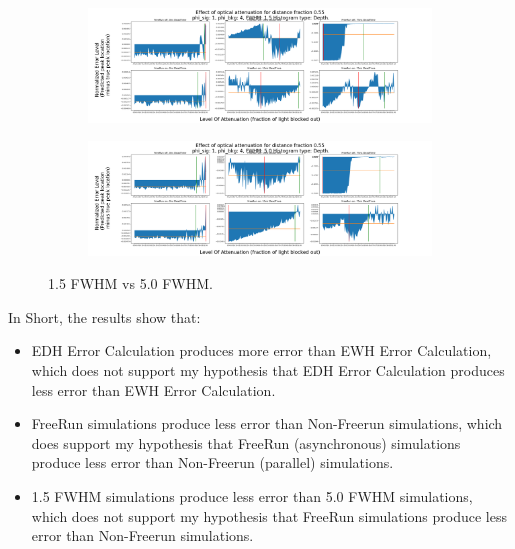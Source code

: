 \documentclass{beamer}
\begin{document}
\begin{frame}
  \begin{figure}[H]
    \centering
    \begin{subfigure}[b]{1\textwidth}
      \includegraphics[width=1\linewidth]{1.5Example.png}
      \label{fig:1.5Example}
    \end{subfigure}
    \begin{subfigure}[b]{1\textwidth}
      \includegraphics[width=1\linewidth]{5.0Example.png}
      \label{fig:5.0Example}
    \end{subfigure}
    \caption{\label{fig:pulseComparison}1.5 FWHM vs 5.0 FWHM.}
  \end{figure}
\end{frame}

\begin{frame}
\end{frame}

\begin{frame}
  In Short, the results show that:
  \begin{itemize}
  \item EDH Error Calculation produces more error than EWH Error Calculation, which does not support my hypothesis that EDH Error Calculation produces less error than EWH Error Calculation.
  \item FreeRun simulations produce less error than Non-Freerun simulations, which does support my hypothesis that FreeRun (asynchronous) simulations produce less error than Non-Freerun (parallel) simulations.
  \item 1.5 FWHM simulations produce less error than 5.0 FWHM simulations, which does not support my hypothesis that FreeRun simulations produce less error than Non-Freerun simulations.
  \end{itemize}
\end{frame}
\end{document}
